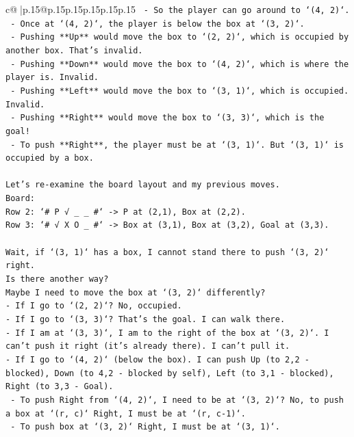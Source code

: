 \documentclass{article}
\begin{document}
{\begin{supertabular}{c@{$\;$}|p{.15\linewidth}@{}p{.15\linewidth}p{.15\linewidth}p{.15\linewidth}p{.15\linewidth}p{.15\linewidth}}
{{{\texttt{        {-} So the player can go around to `(4, 2)`.} \\
\texttt{    {-} Once at `(4, 2)`, the player is below the box at `(3, 2)`.} \\
\texttt{    {-} Pushing **Up** would move the box to `(2, 2)`, which is occupied by another box. That's invalid.} \\
\texttt{    {-} Pushing **Down** would move the box to `(4, 2)`, which is where the player is. Invalid.} \\
\texttt{    {-} Pushing **Left** would move the box to `(3, 1)`, which is occupied. Invalid.} \\
\texttt{    {-} Pushing **Right** would move the box to `(3, 3)`, which is the goal!} \\
\texttt{    {-} To push **Right**, the player must be at `(3, 1)`. But `(3, 1)` is occupied by a box.} \\
\\ 
\texttt{Let's re{-}examine the board layout and my previous moves.} \\
\texttt{Board:} \\
\texttt{Row 2: `\# P √ \_ \_ \#` {-}> P at (2,1), Box at (2,2).} \\
\texttt{Row 3: `\# √ X O \_ \#` {-}> Box at (3,1), Box at (3,2), Goal at (3,3).} \\
\\ 
\texttt{Wait, if `(3, 1)` has a box, I cannot stand there to push `(3, 2)` right.} \\
\texttt{Is there another way?} \\
\texttt{Maybe I need to move the box at `(3, 2)` differently?} \\
\texttt{{-} If I go to `(2, 2)`? No, occupied.} \\
\texttt{{-} If I go to `(3, 3)`? That's the goal. I can walk there.} \\
\texttt{{-} If I am at `(3, 3)`, I am to the right of the box at `(3, 2)`. I can't push it right (it's already there). I can't pull it.} \\
\texttt{{-} If I go to `(4, 2)` (below the box). I can push Up (to 2,2 {-} blocked), Down (to 4,2 {-} blocked by self), Left (to 3,1 {-} blocked), Right (to 3,3 {-} Goal).} \\
\texttt{    {-} To push Right from `(4, 2)`, I need to be at `(3, 2)`? No, to push a box at `(r, c)` Right, I must be at `(r, c{-}1)`.} \\
\texttt{    {-} To push box at `(3, 2)` Right, I must be at `(3, 1)`.} \\
}}}
\end{supertabular}}
\end{document}
